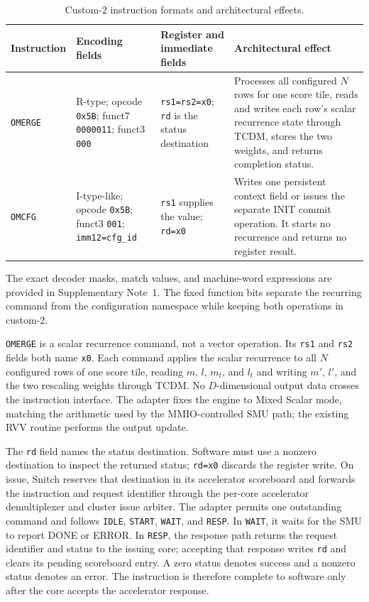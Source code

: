 \documentclass[journal]{IEEEtran}
\begin{document}
\begin{table}[t]
\centering
\caption{Custom-2 instruction formats and architectural effects.}
\label{tab:isa_interface}
\scriptsize
\setlength{\tabcolsep}{2pt}
\begin{tabular}{@{}l p{4.6cm} p{3.8cm} p{7.2cm}@{}}
\toprule
Instruction & Encoding fields & Register and immediate fields & Architectural effect \\
\midrule
\texttt{OMERGE} &
R-type; opcode \texttt{0x5B}; funct7 \texttt{0000011}; funct3 \texttt{000} &
\texttt{rs1=rs2=x0}; \texttt{rd} is the status destination &
Processes all configured $N$ rows for one score tile, reads and writes each
row's scalar recurrence state through TCDM, stores the two weights, and returns
completion status. \\
\addlinespace
\texttt{OMCFG} &
I-type-like; opcode \texttt{0x5B}; funct3 \texttt{001}; \texttt{imm12=cfg\_id} &
\texttt{rs1} supplies the value; \texttt{rd=x0} &
Writes one persistent context field or issues the separate INIT commit
operation. It starts no recurrence and returns no register result. \\
\bottomrule
\end{tabular}
\end{table}

The exact decoder masks, match values, and machine-word expressions are
provided in Supplementary Note~1. The fixed function bits separate the
recurring command from the configuration namespace while keeping both
operations in custom-2.

\texttt{OMERGE} is a scalar recurrence command, not a vector operation. Its
\texttt{rs1} and \texttt{rs2} fields both name \texttt{x0}. Each command
applies the scalar recurrence to all $N$ configured rows of one score tile,
reading $m$, $l$, $m_t$, and $l_t$ and writing $m'$, $l'$, and the two
rescaling weights through TCDM. No $D$-dimensional output data crosses the
instruction interface. The adapter
fixes the engine to Mixed Scalar mode, matching the arithmetic used by the
MMIO-controlled SMU path; the existing RVV routine performs the output update.

The \texttt{rd} field names the status destination. Software must use a
nonzero destination to inspect the returned status; \texttt{rd=x0} discards
the register write. On issue, Snitch reserves that destination in its
accelerator scoreboard and forwards the instruction and
request identifier through the per-core accelerator demultiplexer and cluster
issue arbiter. The adapter permits one outstanding command and follows
\texttt{IDLE}, \texttt{START}, \texttt{WAIT}, and \texttt{RESP}. In
\texttt{WAIT}, it waits for the SMU to report DONE or ERROR. In
\texttt{RESP}, the response path returns the request identifier and status to
the issuing core; accepting that response writes \texttt{rd} and clears its
pending scoreboard entry. A zero status denotes success and a nonzero status
denotes an error. The instruction is therefore complete to software only
after the core accepts the accelerator response.
\end{document}
